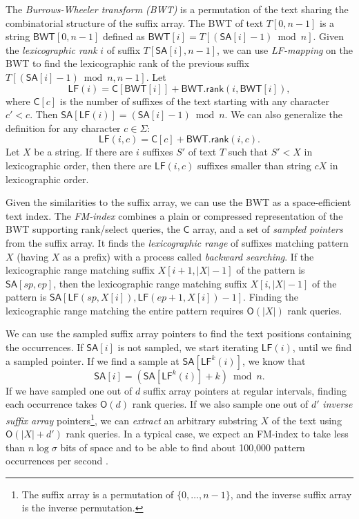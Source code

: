 \documentclass[a4paper,UKenglish]{lipics-v2016}
\newcommand{\set}[1]{\ensuremath{\{ #1 \}}}
\newcommand{\abs}[1]{\ensuremath{\lvert #1 \rvert}}
\newcommand{\Oh}[1]{\ensuremath{\mathsf{O}\!\left( #1 \right)}}
\newcommand{\rank}{\ensuremath{\mathsf{rank}}}
\newcommand{\LF}{\ensuremath{\mathsf{LF}}}
\newcommand{\LFmapping}{LF\nobreakdash-mapping}
\newcommand{\FMindex}{FM\nobreakdash-index}
\newcommand{\SA}{\ensuremath{\mathsf{SA}}}
\newcommand{\BWT}{\ensuremath{\mathsf{BWT}}}
\newcommand{\Carray}{\ensuremath{\mathsf{C}}}
\begin{document}
The \emph{Burrows-Wheeler transform (BWT)} \cite{Burrows1994} is a permutation of the text sharing the combinatorial structure of the suffix array. The BWT of text $T[0, n-1]$ is a string $\BWT[0, n-1]$ defined as $\BWT[i] = T[(\SA[i]-1) \bmod n]$. Given the \emph{lexicographic rank} $i$ of suffix $T[\SA[i], n-1]$, we can use \emph{\LFmapping} on the BWT to find the lexicographic rank of the previous suffix $T[(\SA[i]-1) \bmod n, n-1]$. Let
$$
\LF(i) = \Carray[\BWT[i]] + \BWT.\rank(i, \BWT[i]),
$$
where $\Carray[c]$ is the number of suffixes of the text starting with any character $c' < c$. Then $\SA[\LF(i)] = (\SA[i]-1) \bmod n$. We can also generalize the definition for any character $c \in \Sigma$:
$$
\LF(i, c) = \Carray[c] + \BWT.\rank(i, c).
$$
Let $X$ be a string. If there are $i$ suffixes $S'$ of text $T$ such that $S' < X$ in lexicographic order, then there are $\LF(i, c)$ suffixes smaller than string $cX$ in lexicographic order.

Given the similarities to the suffix array, we can use the BWT as a space-efficient text index. The \emph{\FMindex} \cite{Ferragina2005a} combines a plain or compressed representation of the BWT supporting rank/select queries, the $\Carray$ array, and a set of \emph{sampled pointers} from the suffix array. It finds the \emph{lexicographic range} of suffixes matching pattern $X$ (having $X$ as a prefix) with a process called \emph{backward searching}. If the lexicographic range matching suffix $X[i+1, \abs{X}-1]$ of the pattern is $\SA[sp, ep]$, then the lexicographic range matching suffix $X[i, \abs{X}-1]$ of the pattern is $\SA[\LF(sp, X[i]), \LF(ep+1, X[i]) - 1]$. Finding the lexicographic range matching the entire pattern requires $\Oh{\abs{X}}$ rank queries.

We can use the sampled suffix array pointers to find the text positions containing the occurrences. If $\SA[i]$ is not sampled, we start iterating $\LF(i)$, until we find a sampled pointer. If we find a sample at $\SA[\LF^{k}(i)]$, we know that
$$
\SA[i] = (\SA[\LF^{k}(i)] + k) \bmod n.
$$
If we have sampled one out of $d$ suffix array pointers at regular intervals, finding each occurrence takes $\Oh{d}$ rank queries. If we also sample one out of $d'$ \emph{inverse suffix array} pointers\footnote{The suffix array is a permutation of $\set{0, \dotsc, n-1}$, and the inverse suffix array is the inverse permutation.}, we can \emph{extract} an arbitrary substring $X$ of the text using $\Oh{\abs{X}+d'}$ rank queries. In a typical case, we expect an \FMindex{} to take less than $n \log \sigma$ bits of space and to be able to find about 100,000 pattern occurrences per second \cite{Ferragina2009a}.
\end{document}
